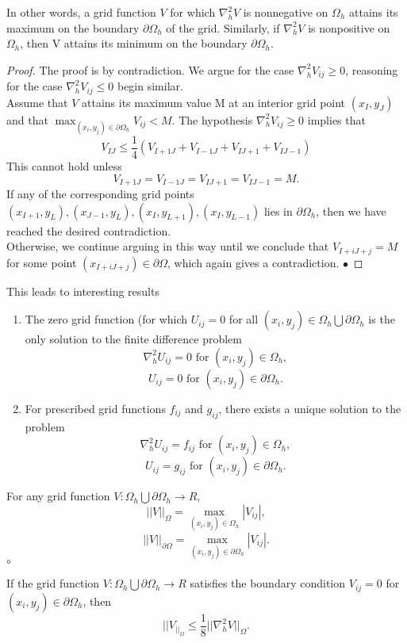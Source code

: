 In other words, a grid function $V$ for which $\nabla^2_hV$ is nonnegative on $\Omega_h$ attains its maximum on the boundary $\partial\Omega_h$ of the grid.  Similarly, if $\nabla^2_hV$ is nonpositive on $\Omega_h$, then V attains its minimum on the boundary $\partial\Omega_h$.
\begin{proof}
The proof is by contradiction.  We argue for the case $\nabla_h^2V_{ij} \geq 0$, reasoning for the case $\nabla_h^2V_{ij}\leq 0$ begin similar.\\
Assume that $V$ attains its maximum value M at an interior grid point $(x_I,y_J)$ and that $\max_{(x_i,y_j)\in\partial\Omega_h}V_{ij}<M.$ The hypothesis $\nabla_{h}^2V_{ij} \geq 0$ implies that
\[ V_{IJ}\leq\frac{1}{4}(V_{I+1J}+V_{I-1J}+V_{IJ+1}+V_{IJ-1}) \]
This cannot hold unless
\[ V_{I+1J}=V_{I-1J}=V_{IJ+1}=V_{IJ-1}=M. \]
If any of the corresponding grid points $(x_{I+1},y_{L}),(x_{J-1},y_{L}),(x_{I},y_{L+1}),(x_{I},y_{L-1})$ lies in $\partial\Omega_h$, then we have reached the 
desired contradiction.\\
Otherwise, we continue arguing in this way until we conclude that $V_{I+iJ+j}=M$
for some point $(x_{I+iJ+j})\in \partial\Omega$, which again gives a contradiction.
$\bullet$\end{proof}
This leads to interesting results
\begin{proposition}
\begin{enumerate}
\item
The zero grid function (for which $U_{ij}=0$ for all $(x_i,y_j) \in \Omega_h \bigcup \partial\Omega_h$
is the only solution to the finite difference problem
\[\nabla_h^2U_{ij}=0 \mbox{ for }(x_i,y_j)\in\Omega_h,\]
\[U_{ij}=0 \mbox{ for }(x_i,y_j)\in\partial\Omega_h.\]
\item
For prescribed grid functions $f_{ij}$ and $g_{ij}$, there exists a unique solution to the problem
\[\nabla_h^2U_{ij}=f_{ij} \mbox{ for }(x_i,y_j)\in\Omega_h,\]
\[U_{ij}=g_{ij} \mbox{ for }(x_i,y_j)\in\partial\Omega_h.\]
\end{enumerate}
\end{proposition}
\begin{definition}
For any grid function $V:\Omega_h\bigcup\partial\Omega_h \rightarrow R$,
\[||V||_{\Omega} =\max_{(x_i,y_j)\in\Omega_h}|V_{ij}|, \]
\[||V||_{\partial\Omega} =\max_{(x_i,y_j)\in\partial\Omega_h}|V_{ij}|. \]
$\circ$
\end{definition}
\begin{lemma}
If the grid function $V:\Omega_h\bigcup\partial\Omega_h\rightarrow R$ satisfies the boundary condition $V_{ij}=0$ for $(x_i,y_j)\in \partial\Omega_h$, then
\[||V_||_{\Omega}\leq \frac{1}{8}||\nabla_h^2V||_{\Omega}. \]
\end{lemma}
